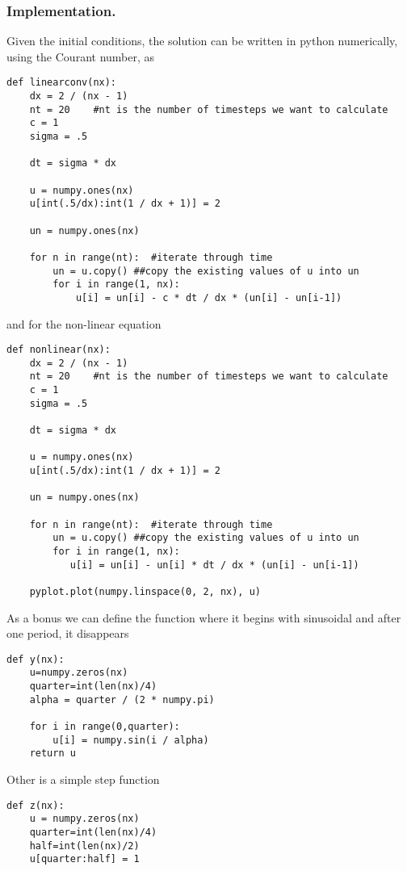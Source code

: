 \documentclass[../../../main.tex]{subfiles}
\begin{document}
\subsubsection*{Implementation.}
Given the initial conditions, the solution can be written in python numerically, using the Courant number, as
\begin{verbatim}
def linearconv(nx):
    dx = 2 / (nx - 1)
    nt = 20    #nt is the number of timesteps we want to calculate
    c = 1
    sigma = .5
    
    dt = sigma * dx

    u = numpy.ones(nx) 
    u[int(.5/dx):int(1 / dx + 1)] = 2

    un = numpy.ones(nx)

    for n in range(nt):  #iterate through time
        un = u.copy() ##copy the existing values of u into un
        for i in range(1, nx):
            u[i] = un[i] - c * dt / dx * (un[i] - un[i-1])
\end{verbatim}
and for the non-linear equation
\begin{verbatim}
def nonlinear(nx):
    dx = 2 / (nx - 1)
    nt = 20    #nt is the number of timesteps we want to calculate
    c = 1
    sigma = .5
    
    dt = sigma * dx

    u = numpy.ones(nx) 
    u[int(.5/dx):int(1 / dx + 1)] = 2

    un = numpy.ones(nx)

    for n in range(nt):  #iterate through time
        un = u.copy() ##copy the existing values of u into un
        for i in range(1, nx):
           u[i] = un[i] - un[i] * dt / dx * (un[i] - un[i-1]) 
        
    pyplot.plot(numpy.linspace(0, 2, nx), u)
\end{verbatim}
As a bonus we can define the function where it begins with sinusoidal and after one period, it disappears
\begin{verbatim}
def y(nx):
    u=numpy.zeros(nx)
    quarter=int(len(nx)/4)
    alpha = quarter / (2 * numpy.pi) 

    for i in range(0,quarter):
        u[i] = numpy.sin(i / alpha)
    return u
\end{verbatim}
Other is a simple step function
\begin{verbatim}
def z(nx):
    u = numpy.zeros(nx) 
    quarter=int(len(nx)/4)
    half=int(len(nx)/2)
    u[quarter:half] = 1
\end{verbatim}
\end{document}
